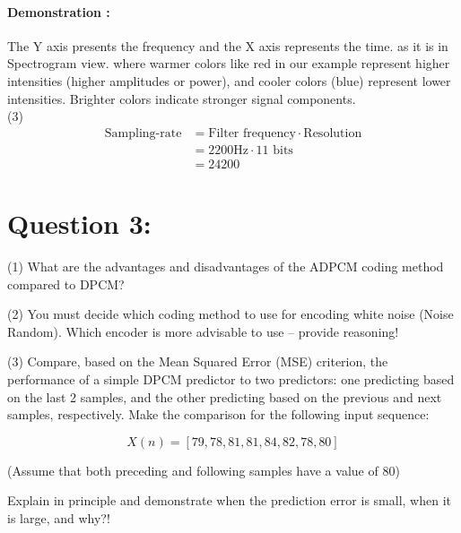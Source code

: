 \documentclass[letterpaper, 12pt]{article}
\begin{document}
\paragraph{Demonstration :} 
The Y axis presents the frequency and the X axis represents the time. as it is in Spectrogram view. where warmer colors like red in our example represent higher intensities (higher amplitudes or power), and cooler colors (blue) represent lower intensities. Brighter colors indicate stronger signal components.\\


(3) 
\begin{align*}
\text{Sampling-rate} &= \text{Filter frequency} \cdot \text{Resolution} \\
&= 2200 \text{Hz} \cdot 11 \text{ bits} \\
&= 24200
\end{align*}

\newpage

\section*{Question 3:}
(1) What are the advantages and disadvantages of the ADPCM coding method compared to DPCM?

(2) You must decide which coding method to use for encoding white noise (Noise Random). Which encoder is more advisable to use – provide reasoning!

(3) Compare, based on the Mean Squared Error (MSE) criterion, the performance of a simple DPCM predictor to two predictors: one predicting based on the last 2 samples, and the other predicting based on the previous and next samples, respectively. Make the comparison for the following input sequence:

\[ X(n) = [79, 78, 81, 81, 84, 82, 78, 80] \]

(Assume that both preceding and following samples have a value of 80)

Explain in principle and demonstrate when the prediction error is small, when it is large, and why?!
\end{document}
